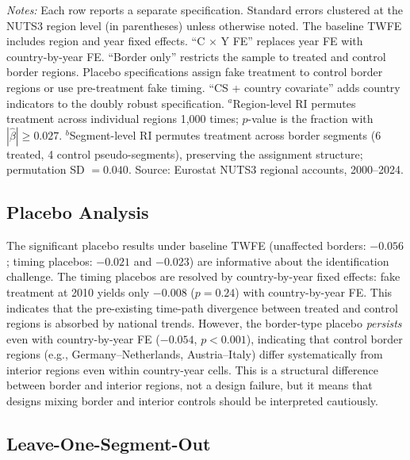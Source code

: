 \documentclass[12pt]{article}
\begin{document}
\begin{table}[H]
\begin{minipage}{0.95\textwidth}
\vspace{0.3em}
\footnotesize \textit{Notes:} Each row reports a separate specification. Standard errors clustered at the NUTS3 region level (in parentheses) unless otherwise noted. The baseline TWFE includes region and year fixed effects. ``C $\times$ Y FE'' replaces year FE with country-by-year FE. ``Border only'' restricts the sample to treated and control border regions. Placebo specifications assign fake treatment to control border regions or use pre-treatment fake timing. ``CS + country covariate'' adds country indicators to the doubly robust specification. $^{a}$Region-level RI permutes treatment across individual regions 1,000 times; $p$-value is the fraction with $|\hat{\beta}| \geq 0.027$. $^{b}$Segment-level RI permutes treatment across border segments (6 treated, 4 control pseudo-segments), preserving the assignment structure; permutation SD $= 0.040$. Source: Eurostat NUTS3 regional accounts, 2000--2024.
\end{minipage}
\end{table}

\subsection{Placebo Analysis}

The significant placebo results under baseline TWFE (unaffected borders: $-0.056$; timing placebos: $-0.021$ and $-0.023$) are informative about the identification challenge. The timing placebos are resolved by country-by-year fixed effects: fake treatment at 2010 yields only $-0.008$ ($p = 0.24$) with country-by-year FE. This indicates that the pre-existing time-path divergence between treated and control regions is absorbed by national trends. However, the border-type placebo \textit{persists} even with country-by-year FE ($-0.054$, $p < 0.001$), indicating that control border regions (e.g., Germany--Netherlands, Austria--Italy) differ systematically from interior regions even within country-year cells. This is a structural difference between border and interior regions, not a design failure, but it means that designs mixing border and interior controls should be interpreted cautiously.

\subsection{Leave-One-Segment-Out}
\end{document}
